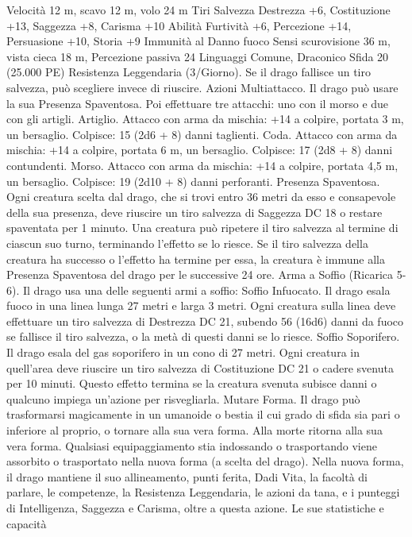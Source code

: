 \begin{multicols}{2}
Velocità 12 m, scavo 12 m, volo 24 m
Tiri Salvezza Destrezza +6, Costituzione +13, Saggezza +8,
Carisma +10
Abilità Furtività +6, Percezione +14, Persuasione +10, Storia +9
Immunità al Danno fuoco
Sensi scurovisione 36 m, vista cieca 18 m, Percezione passiva 24
Linguaggi Comune, Draconico
Sfida 20 (25.000 PE)
Resistenza Leggendaria (3/Giorno). Se il drago fallisce un tiro
salvezza, può scegliere invece di riuscire.
Azioni
Multiattacco. Il drago può usare la sua Presenza Spaventosa. Poi
effettuare tre attacchi: uno con il morso e due con gli artigli.
Artiglio. Attacco con arma da mischia: +14 a colpire, portata 3
m, un bersaglio.
Colpisce: 15 (2d6 + 8) danni taglienti.
Coda. Attacco con arma da mischia: +14 a colpire, portata 6 m,
un bersaglio.
Colpisce: 17 (2d8 + 8) danni contundenti.
Morso. Attacco con arma da mischia: +14 a colpire, portata 4,5
m, un bersaglio.
Colpisce: 19 (2d10 + 8) danni perforanti.
Presenza Spaventosa. Ogni creatura scelta dal drago, che si trovi
entro 36 metri da esso e consapevole della sua presenza, deve
riuscire un tiro salvezza di Saggezza DC 18 o restare spaventata per
1 minuto. Una creatura può ripetere il tiro salvezza al termine di
ciascun suo turno, terminando l’effetto se lo riesce. Se il tiro salvezza
della creatura ha successo o l’effetto ha termine per essa, la creatura è
immune alla Presenza Spaventosa del drago per le successive 24 ore.
Arma a Soffio (Ricarica 5-6). Il drago usa una delle seguenti armi
a soffio:
Soffio Infuocato. Il drago esala fuoco in una linea lunga 27 metri e
larga 3 metri. Ogni creatura sulla linea deve effettuare un tiro
salvezza di Destrezza DC 21, subendo 56 (16d6) danni da fuoco se
fallisce il tiro salvezza, o la metà di questi danni se lo riesce.
Soffio Soporifero. Il drago esala del gas soporifero in un cono di 27
metri. Ogni creatura in quell’area deve riuscire un tiro salvezza di
Costituzione DC 21 o cadere svenuta per 10 minuti. Questo effetto
termina se la creatura svenuta subisce danni o qualcuno impiega
un’azione per risvegliarla.
Mutare Forma. Il drago può trasformarsi magicamente in un
umanoide o bestia il cui grado di sfida sia pari o inferiore al proprio,
o tornare alla sua vera forma. Alla morte ritorna alla sua vera forma.
Qualsiasi equipaggiamento stia indossando o trasportando viene
assorbito o trasportato nella nuova forma (a scelta del drago).
Nella nuova forma, il drago mantiene il suo allineamento, punti
ferita, Dadi Vita, la facoltà di parlare, le competenze, la Resistenza
Leggendaria, le azioni da tana, e i punteggi di Intelligenza, Saggezza
e Carisma, oltre a questa azione. Le sue statistiche e capacità

\end{multicols}
